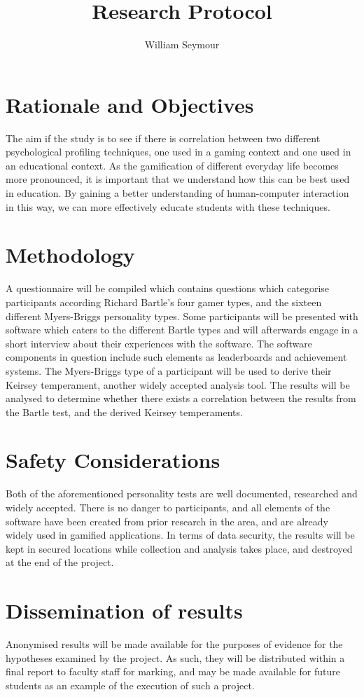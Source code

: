 \documentclass{article}
\author{William Seymour}
\title{Research Protocol}
\begin{document}
	\maketitle
\section{Rationale and Objectives}
The aim if the study is to see if there is correlation between two different psychological profiling techniques, one used in a gaming context and one used in an educational context. As the gamification of different everyday life becomes more pronounced, it is important that we understand how this can be best used in education. By gaining a better understanding of human-computer interaction in this way, we can more effectively educate students with these techniques.
\section{Methodology}
A questionnaire will be compiled which contains questions which categorise participants according Richard Bartle's four gamer types, and the sixteen different Myers-Briggs personality types. Some participants will be presented with software which caters to the different Bartle types and will afterwards engage in a short interview about their experiences with the software. The software components in question include such elements as leaderboards and achievement systems. The Myers-Briggs type of a participant will be used to derive their Keirsey temperament, another widely accepted analysis tool. The results will be analysed to determine whether there exists a correlation between the results from the Bartle test, and the derived Keirsey temperaments.
\section{Safety Considerations}
Both of the aforementioned personality tests are well documented, researched and widely accepted. There is no danger to participants, and all elements of the software have been created from prior research in the area, and are already widely used in gamified applications. In terms of data security, the results will be kept in secured locations while collection and analysis takes place, and destroyed at the end of the project.
\section{Dissemination of results}
Anonymised results will be made available for the purposes of evidence for the hypotheses examined by the project. As such, they will be distributed within a final report to faculty staff for marking, and may be made available for future students as an example of the execution of such a project.
\end{document}
